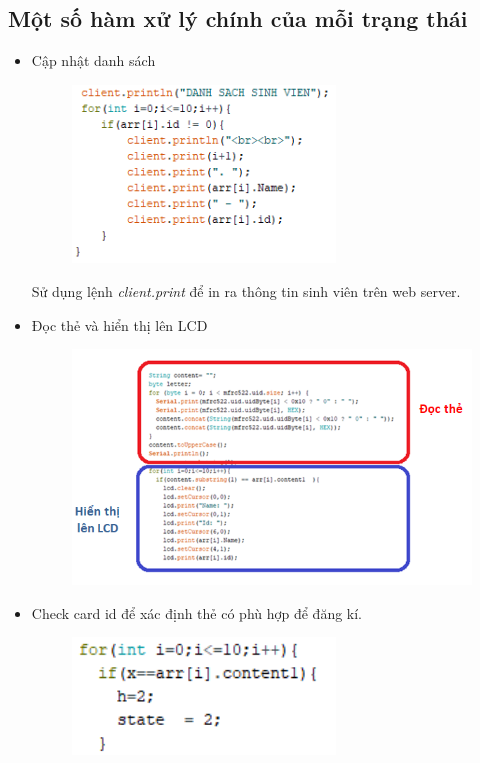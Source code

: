 \documentclass[12pt,titlepage,a4paper]{article}
\begin{document}
\subsection{Một số hàm xử lý chính của mỗi trạng thái}
\begin{itemize}
\item Cập nhật danh sách


\begin{figure}[h!]
\begin{center}
\includegraphics[width=7cm]{7.png}
\end{center}
\end{figure}


Sử dụng lệnh \textit{client.print} để in ra thông tin sinh viên trên web server.
\newpage
\item Đọc thẻ và hiển thị lên LCD

\begin{figure}[h!]
\begin{center}
\includegraphics[width=15cm]{8.png}
\end{center}
\end{figure}

\item Check card id để xác định thẻ có phù hợp để đăng kí.
\begin{figure}[h!]
\begin{center}
\includegraphics[width=7cm]{9.png}
\end{center}
\end{figure}


\end{itemize}
\end{document}
